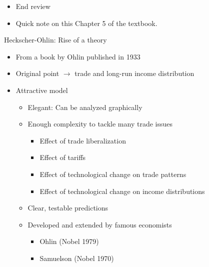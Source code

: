 \documentclass[ignorenonframetext,]{beamer}
\begin{document}
\begin{frame}
    \begin{itemize}
        \item End review 
    \end{itemize}
\end{frame}

\begin{frame}
\begin{itemize}
    \item Quick note on this Chapter 5 of the textbook.
\end{itemize}

\end{frame}
\begin{frame}{Heckscher-Ohlin: Rise of a theory}

    \begin{itemize}
        \item From a book by Ohlin published in 1933 
        \item Original point $\rightarrow$ trade and long-run income distribution
        \item Attractive model
        \begin{itemize}
            \item Elegant: Can be analyzed graphically
            \item Enough complexity to tackle many trade issues
            \begin{itemize}
                \item Effect of trade liberalization
                \item Effect of tariffs
                \item Effect of technological change on trade patterns
                \item Effect of technological change on income distributions 
            \end{itemize}
            \item Clear, testable predictions
            \item Developed and extended by famous economists
            \begin{itemize}
                \item Ohlin (Nobel 1979)
                \item Samuelson (Nobel 1970)
            \end{itemize}
        \end{itemize}
    \end{itemize}

\end{frame}
\end{document}
